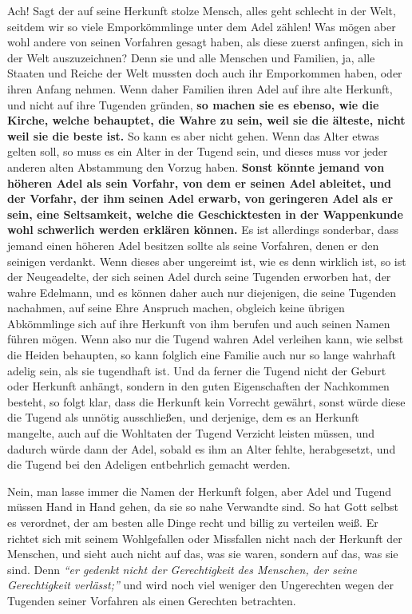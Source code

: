 Ach! Sagt der auf seine Herkunft stolze Mensch, alles geht schlecht in der Welt,
seitdem wir so viele Emporkömmlinge unter dem
Adel
zählen! Was mögen aber wohl
andere von seinen Vorfahren gesagt haben, als diese zuerst anfingen, sich in der
Welt auszuzeichnen? Denn sie und alle Menschen und Familien, ja, alle Staaten
und Reiche der Welt mussten doch auch ihr Emporkommen haben, oder ihren Anfang
nehmen. Wenn daher Familien ihren Adel auf ihre alte Herkunft, und nicht auf
ihre
Tugenden gründen, \label{ref:11_04_abstammung} \textbf{so machen sie es ebenso,
wie die Kirche, welche behauptet,
die Wahre zu sein, weil sie die älteste, nicht weil sie die beste ist.} So kann
es aber nicht gehen. Wenn das Alter etwas gelten soll, so muss es ein Alter in
der Tugend sein, und dieses muss vor jeder anderen alten Abstammung den Vorzug
haben. \textbf{Sonst könnte jemand von höheren Adel als sein Vorfahr, von dem er
seinen
Adel ableitet, und der Vorfahr, der ihm seinen Adel erwarb, von geringeren Adel
als er sein, eine Seltsamkeit, welche die Geschicktesten in der
Wappenkunde wohl
schwerlich werden erklären können.} Es ist allerdings sonderbar, dass jemand
einen höheren Adel besitzen sollte als seine Vorfahren, denen er den seinigen
verdankt. Wenn dieses aber ungereimt ist, wie es denn wirklich ist, so ist der
Neugeadelte, der sich seinen Adel durch seine Tugenden erworben hat, der wahre
Edelmann, und es können daher auch nur diejenigen, die seine Tugenden
nachahmen, auf seine Ehre Anspruch machen, obgleich keine übrigen Abkömmlinge
sich auf ihre Herkunft von ihm berufen und auch seinen Namen führen mögen. Wenn
also nur die Tugend wahren Adel verleihen kann, wie selbst die
Heiden behaupten,
so kann folglich eine Familie auch nur so lange wahrhaft adelig sein, als sie
tugendhaft ist. Und da ferner die Tugend nicht der Geburt oder Herkunft anhängt,
sondern in den guten Eigenschaften der Nachkommen besteht, so folgt klar, dass
die Herkunft kein Vorrecht gewährt, sonst würde diese die Tugend als unnötig
ausschließen, und derjenige, dem es an Herkunft mangelte, auch auf die Wohltaten
der Tugend Verzicht leisten müssen, und dadurch würde dann der Adel, sobald es
ihm an Alter fehlte, herabgesetzt, und die Tugend bei den Adeligen entbehrlich
gemacht werden.

\medskip

Nein, man lasse immer die Namen der Herkunft folgen, aber Adel und Tugend müssen
Hand in Hand gehen, da sie so nahe Verwandte sind. So hat Gott selbst es
verordnet, der am besten alle Dinge recht und billig zu verteilen weiß. Er
richtet sich mit seinem Wohlgefallen oder Missfallen nicht nach der Herkunft der
Menschen, und sieht auch nicht auf das, was sie waren, sondern auf das, was sie
sind. Denn
\textit{"`er gedenkt nicht der Gerechtigkeit des Menschen, der seine
Gerechtigkeit verlässt;"'}
und wird noch viel weniger den
Ungerechten wegen der Tugenden seiner Vorfahren als einen Gerechten betrachten.

